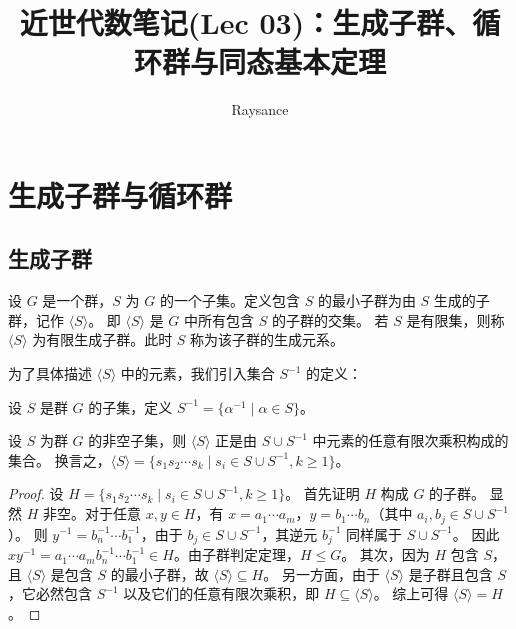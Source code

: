 \documentclass[11pt]{article}
\title{近世代数笔记(Lec 03)：生成子群、循环群与同态基本定理}
\author{Raysance}
\date{}
\begin{document}
\maketitle

\section{生成子群与循环群}

\subsection{生成子群}

\begin{cndefinition}[生成子群]
设 $G$ 是一个群，$S$ 为 $G$ 的一个子集。定义包含 $S$ 的最小子群为由 $S$ 生成的子群，记作 $\langle S \rangle$。
即 $\langle S \rangle$ 是 $G$ 中所有包含 $S$ 的子群的交集。
若 $S$ 是有限集，则称 $\langle S \rangle$ 为有限生成子群。此时 $S$ 称为该子群的生成元系。
\end{cndefinition}

为了具体描述 $\langle S \rangle$ 中的元素，我们引入集合 $S^{-1}$ 的定义：
\begin{cndefinition}[逆元集合]
设 $S$ 是群 $G$ 的子集，定义 $S^{-1} = \{ \alpha^{-1} \mid \alpha \in S \}$。
\end{cndefinition}

\begin{cntheorem}[生成子群的充分必要刻画]
设 $S$ 为群 $G$ 的非空子集，则 $\langle S \rangle$ 正是由 $S \cup S^{-1}$ 中元素的任意有限次乘积构成的集合。
换言之，$\langle S \rangle = \{ s_1 s_2 \cdots s_k \mid s_i \in S \cup S^{-1}, k \ge 1 \}$。
\end{cntheorem}
\begin{proof}
设 $H = \{ s_1 s_2 \cdots s_k \mid s_i \in S \cup S^{-1}, k \ge 1 \}$。
首先证明 $H$ 构成 $G$ 的子群。
显然 $H$ 非空。对于任意 $x, y \in H$，有 $x = a_1 \cdots a_m$，$y = b_1 \cdots b_n$（其中 $a_i, b_j \in S \cup S^{-1}$）。
则 $y^{-1} = b_n^{-1} \cdots b_1^{-1}$，由于 $b_j \in S \cup S^{-1}$，其逆元 $b_j^{-1}$ 同样属于 $S \cup S^{-1}$。
因此 $xy^{-1} = a_1 \cdots a_m b_n^{-1} \cdots b_1^{-1} \in H$。由子群判定定理，$H \le G$。
其次，因为 $H$ 包含 $S$，且 $\langle S \rangle$ 是包含 $S$ 的最小子群，故 $\langle S \rangle \subseteq H$。
另一方面，由于 $\langle S \rangle$ 是子群且包含 $S$，它必然包含 $S^{-1}$ 以及它们的任意有限次乘积，即 $H \subseteq \langle S \rangle$。
综上可得 $\langle S \rangle = H$。
\end{proof}
\end{document}
